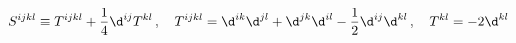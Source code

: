 \begin{equation}
S^{ijkl}\equiv T^{ijkl}+\frac{1}{4}\d^{ij}T^{kl}\,,\quad
T^{ijkl}=\d^{ik}\d^{jl}+\d^{jk}\d^{il}-\frac{1}{2}\d^{ij}\d^{kl}\,,\quad
T^{kl} = -2\d^{kl}
\end{equation}

